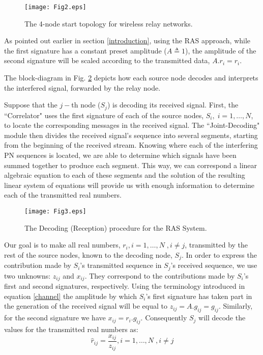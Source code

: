 \documentclass[conference]{IEEEtran}
\begin{document}
\begin{figure}[tp]
\centering
\texttt{[image: Fig2.eps]}
\caption{The 4-node start topology for wireless relay networks.}
\label{fig:starnet}
\end{figure}

As pointed out earlier in section \ref{introduction}, using the RAS approach, while the first signature has a constant preset amplitude ($A \triangleq 1$), the amplitude of the second signature will be scaled according to the transmitted data, $A.r_{i} = r_i$.

The block-diagram in Fig. \ref{fig:BD} depicts how each source node decodes and interprets the interfered signal, forwarded by the relay node.

Suppose that the $j-$th node ($S_j$) is decoding its received signal. First, the ``Correlator" uses the first signature of each of the source nodes,  $S_i, \; i = 1, \ldots, N$, to locate the corresponding messages in the received signal. The ``Joint-Decoding" module then divides the received signal's sequence into several segments, starting from the beginning of the received stream. Knowing where each of the interfering PN sequences is located, we are able to determine which signals have been summed together to produce each segment. This way, we can correspond a linear algebraic equation to each of these segments and the solution of the resulting linear system of equations will provide us with enough information to determine each of the transmitted real numbers. 

\begin{figure}[tp]
\centering
\texttt{[image: Fig3.eps]}
\caption{The Decoding (Reception) procedure for the RAS System.}
\label{fig:BD}
\end{figure}

Our goal is to make all real numbers, $r_i, i = 1,\ldots,N \; , i \neq j $,  transmitted by the rest of the source nodes, known to the decoding node, $S_j$. In order to express the contribution made by $S_i$'s transmitted sequence in $S_j$'s received sequence, we use two unknowns: $z_{ij}$ and $x_{ij}$. They correspond to the contributions made by $S_i$'s first and second signatures, respectively. Using the terminology introduced in equation \ref{channel} the amplitude by which $S_i$'s first signature has taken part in the generation of the received signal will be equal to $z_{ij} = A. g_{ij} = g_{ij}$. Similarly, for the second signature we have $x_{ij} = r_{i}.g_{ij}$. Consequently $S_j$ will decode the values for the transmitted real numbers as:
\begin{equation}
\hat{r}_{ij} = \frac{x_{ij}}{z_{ij}}, i = 1,\ldots,N \; , i \neq j
\label{final}
\end{equation}
\end{document}
